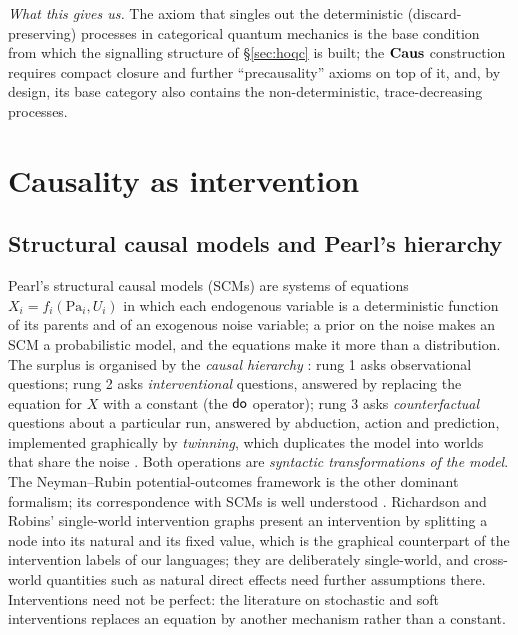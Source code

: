 \emph{What this gives us.} The axiom that singles out the deterministic (discard-preserving) processes in categorical quantum mechanics \cite{PQP_Coecke_Kissinger_2017,chiribella2010purification} is the base condition from which the signalling structure of \S\ref{sec:hoqc} is built; the $\mathbf{Caus}$ construction requires compact closure and further ``precausality'' axioms on top of it, and, by design, its base category also contains the non-deterministic, trace-decreasing processes.

\section{Causality as intervention}\label{sec:intv}

\subsection{Structural causal models and Pearl's hierarchy}

Pearl's structural causal models (SCMs) \cite{pearl2009causality,Pearl2018_book_of_why} are systems of equations $X_i = f_i(\mathrm{Pa}_i, U_i)$ in which each endogenous variable is a deterministic function of its parents and of an exogenous noise variable; a prior on the noise makes an SCM a probabilistic model, and the equations make it more than a distribution. The surplus is organised by the \emph{causal hierarchy} \cite{bareinboim:etal20}: rung 1 asks observational questions; rung 2 asks \emph{interventional} questions, answered by replacing the equation for $X$ with a constant (the $\mathsf{do}$ operator); rung 3 asks \emph{counterfactual} questions about a particular run, answered by abduction, action and prediction, implemented graphically by \emph{twinning}, which duplicates the model into worlds that share the noise \cite{Balke1994}. Both operations are \emph{syntactic transformations of the model}. The Neyman--Rubin potential-outcomes framework \cite{rubin1974} is the other dominant formalism; its correspondence with SCMs is well understood \cite{ibeling2023comparing}. Richardson and Robins' single-world intervention graphs \cite{richardson2013swig} present an intervention by splitting a node into its natural and its fixed value, which is the graphical counterpart of the intervention labels of our languages; they are deliberately single-world, and cross-world quantities such as natural direct effects need further assumptions there. Interventions need not be perfect: the literature on stochastic and soft interventions \cite{dawid2002_stoch_intv,didelez2006_stoch_mech_intv,Eberhardt_Scheines_2007,levis2024stochasticinterventionssensitivityanalysis} replaces an equation by another mechanism rather than a constant.

